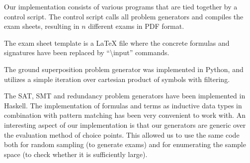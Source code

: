 Our implementation consists of various programs that are tied together by a control script.
The control script calls all problem generators
and compiles the exam sheets, resulting in $n$ different exams in PDF format.

The exam sheet template is a \LaTeX{} file
where the concrete formulas and signatures
have been replaced by ``\textbackslash{}input'' commands.

The ground superposition problem generator was implemented in Python,
and utilizes a simple iteration over cartesian product of symbols
with filtering.

The SAT, SMT and redundancy problem generators have been implemented in Haskell.
The implementation of formulas and terms as inductive data types
in combination with pattern matching has been very convenient to work with.
An interesting aspect of our implementation is that
our generators are generic over the evaluation method of choice points.
This allowed us to use the same code both for random sampling (to generate exams)
and for enumerating the sample space (to check whether it is sufficiently large).

